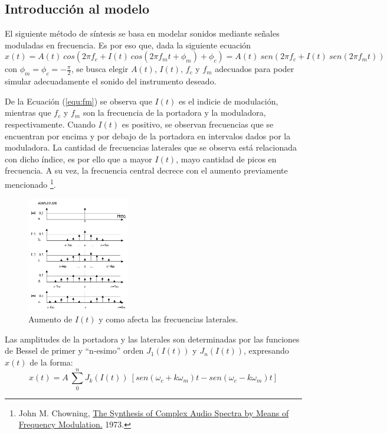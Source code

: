\subsection{Introducción al modelo}

El siguiente método de síntesis se basa en modelar sonidos mediante señales moduladas en frecuencia. Es por eso que, dada la siguiente ecuación
\begin{equation}
	x(t) = A(t) \ cos \left( 2 \pi f_c + I(t) \ cos \left( 2 \pi f_m t + \phi_m \right) + \phi_c \right) = A(t) \ sen \left( 2 \pi f_c + I(t) \ sen \left( 2 \pi f_m t \right) \right)
	\label{equ:fm}
\end{equation}
con $\phi_m = \phi_c = -\frac{\pi}{2}$, se busca elegir $A(t)$, $I(t)$, $f_c$ y $f_m$ adecuados para poder simular adecuadamente el sonido del instrumento deseado.

De la Ecuación (\ref{equ:fm}) se observa que $I(t)$ es el indicie de modulación, mientras que $f_c$ y $f_m$ son la frecuencia de la portadora y la moduladora, respectivamente. Cuando $I(t)$ es positivo, se observan frecuencias que se encuentran por encima y por debajo de la portadora en intervalos dados por la moduladora. La cantidad de frecuencias laterales que se observa está relacionada con dicho índice, es por ello que a mayor $I(t)$, mayo cantidad de picos en frecuencia. A su vez, la frecuencia central decrece con el aumento previamente mencionado \footnote{John M. Chowning, \href{https://ccrma.stanford.edu/sites/default/files/user/jc/fm_synthesispaper-2.pdf}{The Synthesis of Complex Audio Spectra by Means of Frequency Modulation.} 1973.}.
\begin{figure}[H]
	\centering
	\includegraphics[width=0.4\textwidth]{ImagenesEjercicio3/Increasing-BW-I.png}
	\caption{Aumento de $I(t)$ y como afecta las frecuencias laterales.}
	\label{fig:Iaumenta}
\end{figure}

Las amplitudes de la portadora y las laterales son determinadas por las funciones de Bessel de primer y ``n-esimo'' orden $J_1 \left( I(t) \right)$ y $J_n \left( I(t) \right)$, expresando $x(t)$ de la forma:
\begin{equation}
	x(t) = A \ \sum_{0}^{n} J_k \left(I(t) \right) \ \left[ sen(\omega_c + k \omega_m)t - sen(\omega_c - k \omega_m)t \right]
\end{equation}

